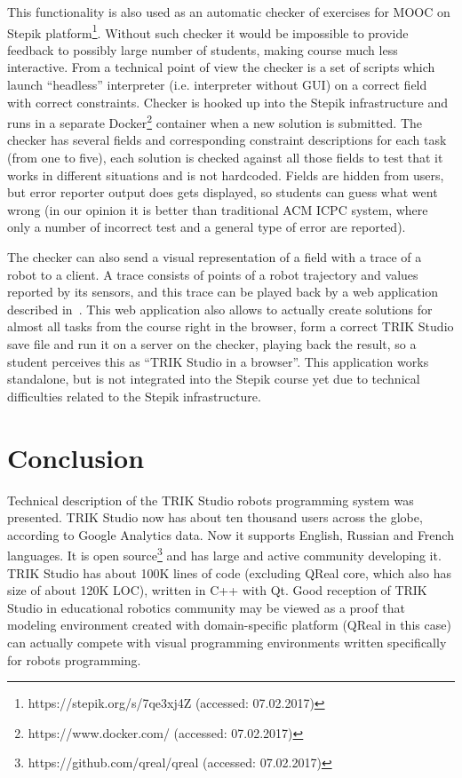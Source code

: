 \documentclass[conference]{IEEEtran}
\begin{document}
This functionality is also used as an automatic checker of exercises for MOOC on Stepik platform\footnote{https://stepik.org/s/7qe3xj4Z (accessed: 07.02.2017)}. Without such checker it would be impossible to provide feedback to possibly large number of students, making course much less interactive. From a technical point of view the checker is a set of scripts which launch ``headless'' interpreter (i.e. interpreter without GUI) on a correct field with correct constraints. Checker is hooked up into the Stepik infrastructure and runs in a separate Docker\footnote{https://www.docker.com/ (accessed: 07.02.2017)} container when a new solution is submitted. The checker has several fields and corresponding constraint descriptions for each task (from one to five), each solution is checked against all those fields to test that it works in different situations and is not hardcoded. Fields are hidden from users, but error reporter output does gets displayed, so students can guess what went wrong (in our opinion it is better than traditional ACM ICPC system, where only a number of incorrect test and a general type of error are reported).

The checker can also send a visual representation of a field with a trace of a robot to a client. A trace consists of points of a robot trajectory and values reported by its sensors, and this trace can be played back by a web application described in~\cite{zakharov2016web}. This web application also allows to actually create solutions for almost all tasks from the course right in the browser, form a correct TRIK Studio save file and run it on a server on the checker, playing back the result, so a student perceives this as ``TRIK Studio in a browser''. This application works standalone, but is not integrated into the Stepik course yet due to technical difficulties related to the Stepik infrastructure.

\section*{Conclusion}
\label{chapter:conclusion}

Technical description of the TRIK Studio robots programming system was presented. TRIK Studio now has about ten thousand users across the globe, according to Google Analytics data. Now it supports English, Russian and French languages. It is open source\footnote{https://github.com/qreal/qreal (accessed: 07.02.2017)} and has large and active community developing it. TRIK Studio has about 100K lines of code (excluding QReal core, which also has size of about 120K LOC), written in C++ with Qt. Good reception of TRIK Studio in educational robotics community may be viewed as a proof that modeling environment created with domain-specific platform (QReal in this case) can actually compete with visual programming environments written specifically for robots programming.
\end{document}
